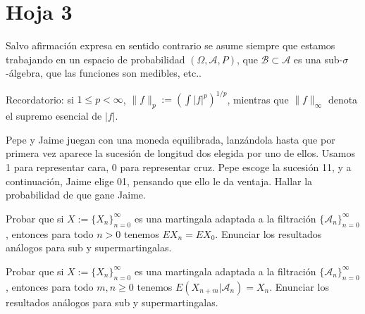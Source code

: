 

\newpage
\section{Hoja 3}

Salvo afirmaci\'on expresa en sentido
contrario se asume siempre que estamos trabajando en un espacio de probabilidad $(\Omega, \mathcal{A}, P)$,
que  $\mathcal{B}\subset \mathcal{A}$ es una sub-$\sigma$-\'algebra, que las funciones son medibles, etc..


Recordatorio: si $1\le p < \infty$, $\|f\|_p := \left(\int|f|^p\right)^{1/p}$, mientras que
$\|f\|_\infty$ denota el supremo esencial de $|f|$. \

\begin{problem}[1] Pepe y Jaime juegan con una moneda equilibrada, lanz\'andola hasta que por primera vez 
aparece la sucesi\'on  de longitud dos  elegida por uno de ellos. Usamos 1 para representar
cara, 0 para representar cruz.
Pepe escoge la sucesi\'on 11, y a continuaci\'on, Jaime elige  01, pensando que ello le da ventaja. 
Hallar la probabilidad de que gane Jaime.
\solution

\begin{expla}

\end{expla}

\end{problem}


\begin{problem}[2] Probar que si $X := \{X_n\}_{n=0}^{\infty}$  es una martingala adaptada a la filtraci\'on
$\{\mathcal{A}_n\}_{n=0}^{\infty}$, entonces para todo $n>0$ tenemos 
$EX_n = EX_0$. 
Enunciar los resultados an\'alogos para sub y supermartingalas.
\solution

\begin{expla}

\end{expla}

\end{problem}


\begin{problem}[3] Probar que si $X := \{X_n\}_{n=0}^{\infty}$  es una martingala adaptada a la filtraci\'on
$\{\mathcal{A}_n\}_{n=0}^{\infty}$, entonces para todo $m, n\ge 0$ tenemos
$E(X_{n + m}|\mathcal{A}_n) = X_n$. Enunciar los resultados an\'alogos para sub y supermartingalas.
\solution

\begin{expla}

\end{expla}

\end{problem}

